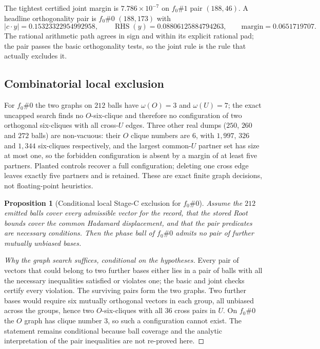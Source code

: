 \documentclass[10pt]{article}
\newtheorem{proposition}[theorem]{Proposition}
\theoremstyle{definition}
\newcommand{\abs}[1]{\lvert #1\rvert}
\begin{document}
The tightest certified joint margin is $7.786\times10^{-7}$ on $f_0\#1$ pair $(188,46)$. A headline orthogonality pair is $f_0\#0$ $(188,173)$ with
\[
\abs{c\cdot y}=0.15323322954992958,\qquad
\operatorname{RHS}(y)=0.08806125884794263,\qquad
\text{margin}=0.0651719707.
\]
The rational arithmetic path agrees in sign and within its explicit rational pad; the pair passes the basic orthogonality tests, so the joint rule is the rule that actually excludes it.

\subsection{Combinatorial local exclusion}

For $f_0\#0$ the two graphs on $212$ balls have $\omega(O)=3$ and $\omega(U)=7$; the exact uncapped search finds no $O$-six-clique and therefore no configuration of two orthogonal six-cliques with all cross-$U$ edges. Three other real dumps ($250$, $260$ and $272$ balls) are non-vacuous: their $O$ clique numbers are $6$, with $1{,}997$, $326$ and $1{,}344$ six-cliques respectively, and the largest common-$U$ partner set has size at most one, so the forbidden configuration is absent by a margin of at least five partners. Planted controls recover a full configuration; deleting one cross edge leaves exactly five partners and is retained. These are exact finite graph decisions, not floating-point heuristics.

\begin{proposition}[Conditional local Stage-C exclusion for $f_0\#0$]\label{prop:localc}
Assume the $212$ emitted balls cover every admissible vector for the record, that the stored Root bounds cover the common Hadamard displacement, and that the pair predicates are necessary conditions. Then the phase ball of $f_0\#0$ admits no pair of further mutually unbiased bases.
\end{proposition}

\begin{proof}[Why the graph search suffices, conditional on the hypotheses]
Every pair of vectors that could belong to two further bases either lies in a pair of balls with all the necessary inequalities satisfied or violates one; the basic and joint checks certify every violation. The surviving pairs form the two graphs. Two further bases would require six mutually orthogonal vectors in each group, all unbiased across the groups, hence two $O$-six-cliques with all $36$ cross pairs in $U$. On $f_0\#0$ the $O$ graph has clique number $3$, so such a configuration cannot exist. The statement remains conditional because ball coverage and the analytic interpretation of the pair inequalities are not re-proved here.
\end{proof}
\end{document}
